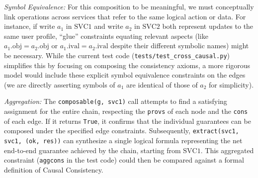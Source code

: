 \textit{Symbol Equivalence:} For this composition to be meaningful, we must
conceptually link operations across services that refer to the same logical
action or data. For instance, if write $a_1$ in $\text{SVC}1$ and
write $a_2$ in $\text{SVC}2$ both
represent updates to the same user profile, ``glue'' constraints
equating relevant
aspects (like $a_1.\text{obj} = a_2.\text{obj}$ or $a_1.\text{ival} =
a_2.\text{ival}$ despite their
different symbolic names) might be necessary. While the current test
code (\texttt{tests/test\_cross\_causal.py})
simplifies this by focusing on composing the consistency axioms, a more rigorous
model would include these explicit symbol equivalence constraints on the edges
(we are directly asserting symbols of $a_1$ are identical of those of $a_2$ for
simplicity).

\textit{Aggregation:} The \texttt{composable(g, svc1)} call attempts
to find a satisfying
assignment for the entire chain, respecting the \texttt{provs} of
each node and the \texttt{cons} of
each edge. If it returns \texttt{True}, it confirms that the
individual guarantees can
be composed under the specified edge constraints. Subsequently,
\texttt{extract(svc1, svc1, (ok, res))} can
synthesize a single logical formula representing the net end-to-end guarantee
achieved by the chain, starting from $\text{SVC}1$. This aggregated
constraint (\texttt{aggcons} in
the test code) could then be compared against a formal definition of Causal
Consistency.

